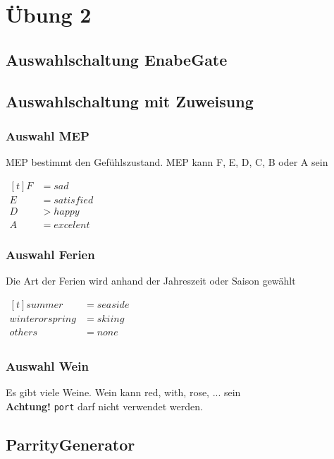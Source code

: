 \section{Übung 2}
\subsection{Auswahlschaltung EnabeGate}

\subsection{Auswahlschaltung mit Zuweisung}
\subsubsection{Auswahl MEP}
MEP bestimmt den Gefühlszustand.
MEP kann F, E, D, C, B oder A sein

$\begin{aligned}[t]
    F &= sad \\
    E &= satisfied\\
    D &> happy \\
    A &= excelent
\end{aligned}$


\subsubsection{Auswahl Ferien}
Die Art der Ferien wird anhand der Jahreszeit oder Saison gewählt
 
$\begin{aligned}[t]
    summer &= seaside \\
    winter or spring &= skiing\\
    others &= none \\
\end{aligned}$

\subsubsection{Auswahl Wein}
Es gibt viele Weine.
Wein kann  red, with, rose, ... sein\\
\textbf{Achtung!} \verb?port? darf nicht verwendet werden. 
 

\subsection{ParrityGenerator}

